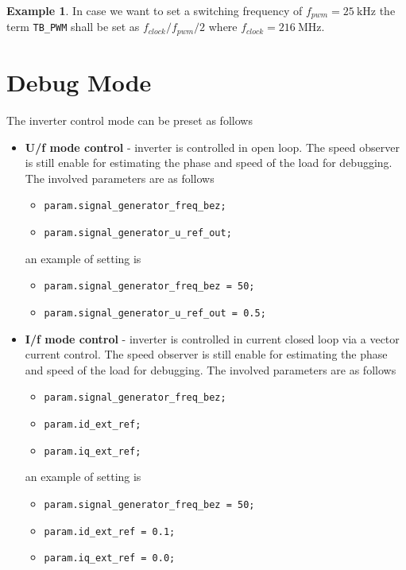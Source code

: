 \documentclass[11pt,a4paper,oneside]{book}
\numberwithin{equation}{section}
\theoremstyle{it}
\theoremstyle{definition}
\newtheorem{example}{Example}[section]
\begin{document}
\begin{example}
	In case we want to set a switching frequency of $f_{pwm} = \SI{25}{\kilo\hertz}$ the term \texttt{TB\_PWM} shall be set as $f_{clock}/f_{pwm}/2$ where $f_{clock} = \SI{216}{\mega\hertz}$.
\end{example}

\section{Debug Mode}	
The inverter control mode can be preset as follows
\begin{itemize}
	\item[--] \textbf{U/f mode control} - inverter is controlled in open loop. The speed observer is still enable for estimating the phase and speed of the load for debugging. The involved parameters are as follows
	\begin{itemize}
		\item[--] \texttt{param.signal\_generator\_freq\_bez;}
		\item[--] \texttt{param.signal\_generator\_u\_ref\_out;}
	\end{itemize} 
	an example of setting is 
	\begin{itemize}
		\item[--] \texttt{param.signal\_generator\_freq\_bez = 50;}
		\item[--] \texttt{param.signal\_generator\_u\_ref\_out = 0.5;}
	\end{itemize} 
	\item[--] \textbf{ I/f mode control} - inverter is controlled in current closed loop via a vector current control. The speed observer is still enable for estimating the phase and speed of the load for debugging. The involved parameters are as follows
	\begin{itemize}
		\item[--] \texttt{param.signal\_generator\_freq\_bez;}   
		\item[--] \texttt{param.id\_ext\_ref;}   	
		\item[--] \texttt{param.iq\_ext\_ref;}   
	\end{itemize} 
	an example of setting is
	\begin{itemize}
		\item[--] \texttt{param.signal\_generator\_freq\_bez = 50;}   
		\item[--] \texttt{param.id\_ext\_ref = 0.1;}   	
		\item[--] \texttt{param.iq\_ext\_ref = 0.0;}   
	\end{itemize} 

\end{itemize}
\end{document}
